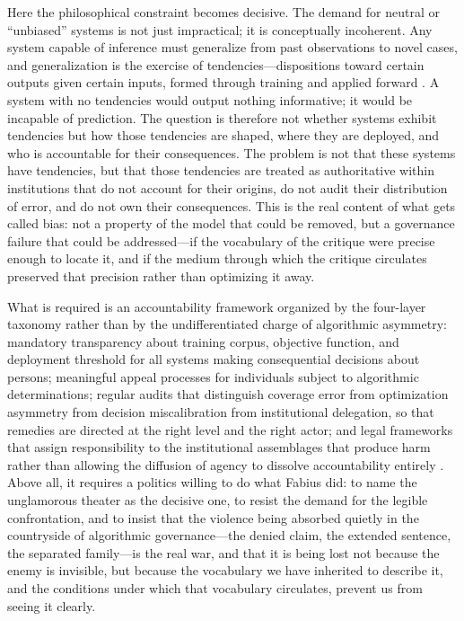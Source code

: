 \documentclass[12pt, a4paper]{article}
\begin{document}
Here the philosophical constraint becomes decisive. The demand for neutral or \enquote{unbiased} systems is not just impractical; it is conceptually incoherent. Any system capable of inference must generalize from past observations to novel cases, and generalization is the exercise of tendencies---dispositions toward certain outputs given certain inputs, formed through training and applied forward \citep{hume1748}. A system with no tendencies would output nothing informative; it would be incapable of prediction. The question is therefore not whether systems exhibit tendencies but how those tendencies are shaped, where they are deployed, and who is accountable for their consequences. The problem is not that these systems have tendencies, but that those tendencies are treated as authoritative within institutions that do not account for their origins, do not audit their distribution of error, and do not own their consequences. This is the real content of what gets called bias: not a property of the model that could be removed, but a governance failure that could be addressed---if the vocabulary of the critique were precise enough to locate it, and if the medium through which the critique circulates preserved that precision rather than optimizing it away.

What is required is an accountability framework organized by the four-layer taxonomy rather than by the undifferentiated charge of algorithmic asymmetry: mandatory transparency about training corpus, objective function, and deployment threshold for all systems making consequential decisions about persons; meaningful appeal processes for individuals subject to algorithmic determinations; regular audits that distinguish coverage error from optimization asymmetry from decision miscalibration from institutional delegation, so that remedies are directed at the right level and the right actor; and legal frameworks that assign responsibility to the institutional assemblages that produce harm rather than allowing the diffusion of agency to dissolve accountability entirely \citep{adalovace2021, busuioc2020}. Above all, it requires a politics willing to do what Fabius did: to name the unglamorous theater as the decisive one, to resist the demand for the legible confrontation, and to insist that the violence being absorbed quietly in the countryside of algorithmic governance---the denied claim, the extended sentence, the separated family---is the real war, and that it is being lost not because the enemy is invisible, but because the vocabulary we have inherited to describe it, and the conditions under which that vocabulary circulates, prevent us from seeing it clearly.
\end{document}
